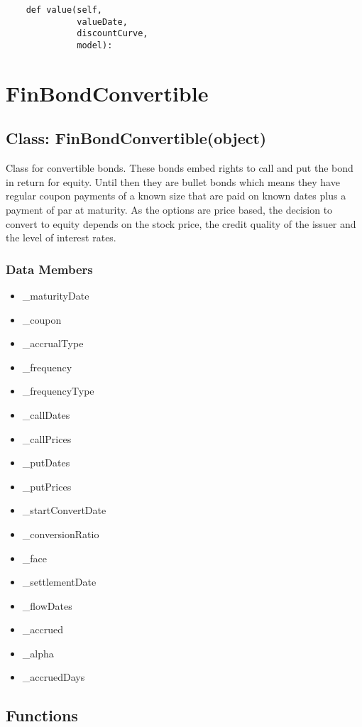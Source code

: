\documentclass[twoside,11pt]{book}
\begin{document}
\begin{lstlisting}
    def value(self,
              valueDate,
              discountCurve,
              model):
\end{lstlisting}

\newpage
\section{FinBondConvertible}

\subsection*{Class: FinBondConvertible(object)}
Class for convertible bonds. These bonds embed rights to call and put the bond in return for equity. Until then they are bullet bonds which means they have regular coupon payments of a known size that are paid on known dates plus a payment of par at maturity. As the options are price based, the decision to convert to equity depends on the stock price, the credit quality of the issuer and the level of interest rates. 

\subsubsection*{Data Members}
\begin{itemize}
\item{\_maturityDate}
\item{\_coupon}
\item{\_accrualType}
\item{\_frequency}
\item{\_frequencyType}
\item{\_callDates}
\item{\_callPrices}
\item{\_putDates}
\item{\_putPrices}
\item{\_startConvertDate}
\item{\_conversionRatio}
\item{\_face}
\item{\_settlementDate}
\item{\_flowDates}
\item{\_accrued}
\item{\_alpha}
\item{\_accruedDays}
\end{itemize}

\subsection*{Functions}
\end{document}
